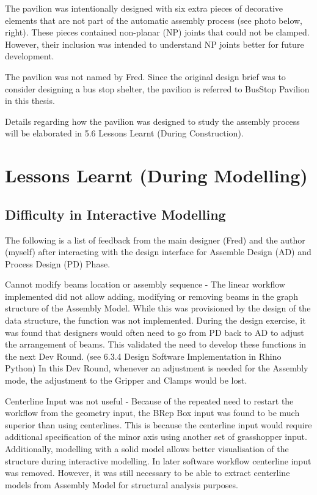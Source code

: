 The pavilion was intentionally designed with six extra pieces of decorative elements that are not part of the automatic assembly process (see photo below, right). These pieces contained non-planar (NP) joints that could not be clamped. However, their inclusion was intended to understand NP joints better for future development.
 
The pavilion was not named by Fred. Since the original design brief was to consider designing a bus stop shelter, the pavilion is referred to BusStop Pavilion in this thesis.

Details regarding how the pavilion was designed to study the assembly process will be elaborated in 5.6 Lessons Learnt (During Construction).

\section{Lessons Learnt (During Modelling)}
\subsection{Difficulty in Interactive Modelling}

The following is a list of feedback from the main designer (Fred) and the author (myself) after interacting with the design interface for Assemble Design (AD) and Process Design (PD) Phase.

Cannot modify beams location or assembly sequence - The linear workflow implemented did not allow adding, modifying or removing beams in the graph structure of the Assembly Model. While this was provisioned by the design of the data structure, the function was not implemented. During the design exercise, it was found that designers would often need to go from PD back to AD to adjust the arrangement of beams. This validated the need to develop these functions in the next Dev Round. (see 6.3.4 Design Software Implementation in Rhino Python) In this Dev Round, whenever an adjustment is needed for the Assembly mode, the adjustment to the Gripper and Clamps would be lost.

Centerline Input was not useful - Because of the repeated need to restart the workflow from the geometry input, the BRep Box input was found to be much superior than using centerlines. This is because the centerline input would require additional specification of the minor axis using another set of grasshopper input. Additionally, modelling with a solid model allows better visualisation of the structure during interactive modelling. In later software workflow centerline input was removed. However, it was still necessary to be able to extract centerline models from Assembly Model for structural analysis purposes.


